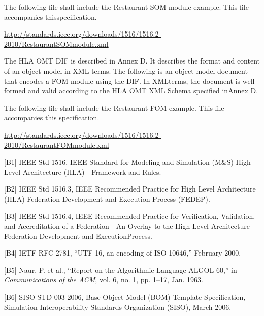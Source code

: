 \vspace{14pt}
The following file shall include the Restaurant SOM module example. This file accompanies this\linebreak specification.

\url{http://standards.ieee.org/downloads/1516/1516.2-2010/RestaurantSOMmodule.xml}
\endgroup

\newpage
\begingroup
\annexbodyfont
\setlength{\parskip}{12pt plus 1pt minus 1pt}
The HLA OMT DIF is described in Annex D. It describes the format and content of an object model in XML terms. The following is an object model document that encodes a FOM module using the DIF. In XML\linebreak terms, the document is well formed and valid according to the HLA OMT XML Schema specified in\linebreak Annex D.

The following file shall include the Restaurant FOM example. This file accompanies this specification.

\vspace{-4pt}\url{http://standards.ieee.org/downloads/1516/1516.2-2010/RestaurantFOMmodule.xml}
\endgroup

\newpage
\thispagestyle{RLHLA}
\begingroup
\annexbodyfont
\setlength{\parskip}{12pt plus 1pt minus 1pt}
[B1] IEEE Std 1516, IEEE Standard for Modeling and Simulation (M\&S) High Level Architecture (HLA)---Framework and Rules.

[B2] IEEE Std 1516.3, IEEE Recommended Practice for High Level Architecture (HLA) Federation Development and Execution Process (FEDEP).

[B3] IEEE Std 1516.4, IEEE Recommended Practice for Verification, Validation, and Accreditation of a Federation---An Overlay to the High Level Architecture Federation Development and Execution\linebreak Process.

[B4] IETF RFC 2781, ``UTF-16, an encoding of ISO 10646,'' February 2000.

[B5] Naur, P. et al., ``Report on the Algorithmic Language ALGOL 60,'' in \textit{Communications of the ACM}, vol. 6, no. 1, pp. 1--17, Jan. 1963.

[B6] SISO-STD-003-2006, Base Object Model (BOM) Template Specification, Simulation Interoperability Standards Organization (SISO), March 2006.
\endgroup

\let\annexhead\relax
\let\annexbodyfont\relax
\let\annexsubhead\relax
\let\bibliographylast\relax

